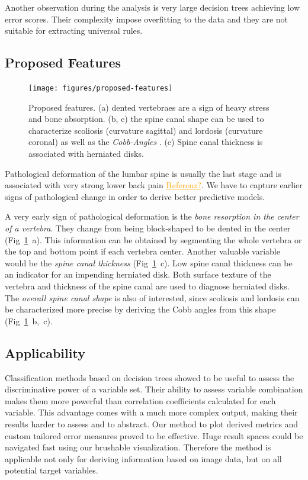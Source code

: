 \documentclass[a4paper,twoside]{style/article}
\newcommand{\com}[1]{\textcolor{orange}{\uline{#1}}}
\begin{document}
Another observation during the analysis is very large decision trees achieving low error scores.
Their complexity impose overfitting to the data and they are not suitable for extracting universal rules.
\subsection{Proposed Features}
\label{sec:ProposedFeatures}
\begin{figure}[!h]
  \centering
  \texttt{[image: figures/proposed-features]}
  \caption{
	Proposed features.
	(a) dented vertebraes are a sign of heavy stress and bone absorption.
	(b, c) the spine canal shape can be used to characterize scoliosis (curvature sagittal) and lordosis (curvature coronal) as well as the \emph{Cobb-Angles} \cite{Cobb}.
	(c) Spine canal thickness is associated with herniated disks.
	}
  \label{fig:proposedFeatures}
\end{figure}
\noindent Pathological deformation of the lumbar spine is usually the last stage and is associated with very strong lower back pain \com{Referenz?}.
We have to capture earlier signs of pathological change in order to derive better predictive models.

A very early sign of pathological deformation is the \emph{bone resorption in the center of a vertebra}.
They change from being block-shaped to be dented in the center (Fig~\ref{fig:proposedFeatures}~a).
This information can be obtained by segmenting the whole vertebra or the top and bottom point if each vertebra center.
Another valuable variable would be the \emph{spine canal thickness} (Fig~\ref{fig:proposedFeatures}~c).
Low spine canal thickness can be an indicator for an impending herniated disk.
Both surface texture of the vertebra and thickness of the spine canal are used to diagnose herniated disks.
The \emph{overall spine canal shape} is also of interested, since scoliosis and lordosis can be characterized more precise by deriving the Cobb angles from this shape (Fig~\ref{fig:proposedFeatures}~b,~c).
\subsection{Applicability}
Classification methods based on decision trees showed to be useful to assess the discriminative power of a variable set.
Their ability to assess variable combination makes them more powerful than correlation coefficients calculated for each variable.
This advantage comes with a much more complex output, making their results harder to assess and to abstract.
Our method to plot derived metrics and custom tailored error measures proved to be effective.
Huge result spaces could be navigated fast using our brushable visualization.
Therefore the method is applicable not only for deriving information based on image data, but on all potential target variables.
\end{document}
